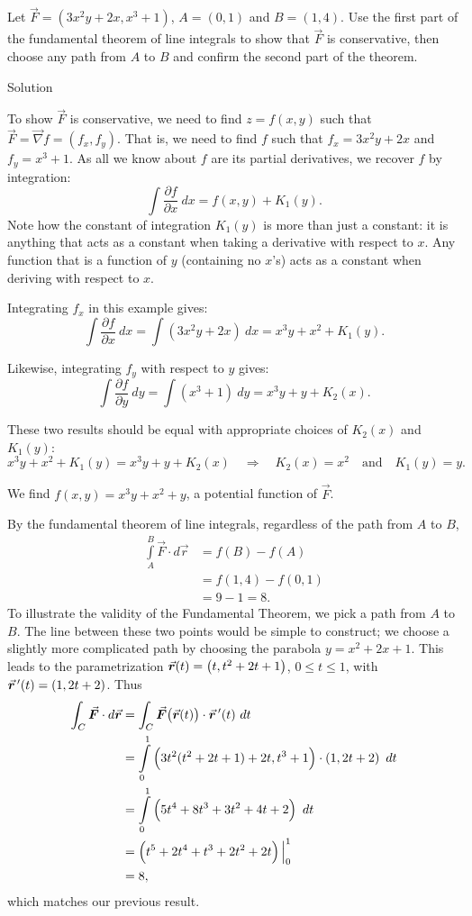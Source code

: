 \begin{example}\label{ex_livf5}
Let $\vec F = \left( 3x^2y+2x, x^3+1\right)$, $A = (0,1)$ and $B = (1,4)$. Use the first part of the fundamental theorem of line integrals to show that $\vec F$ is conservative, then choose any path from $A$ to $B$ and confirm the second part of the theorem.

Solution 


To show $\vec F$ is conservative, we need to find $z = f(x,y)$ such that $\vec F = \vec{\nabla} f = \left( f_x, f_y\right)$. That is, we need to find $f$ such that $f_x = 3x^2y+2x$ and $f_y = x^3+1$. As all we know about $f$ are its partial derivatives, we recover $f$ by integration:
$$\int\limits \frac{\partial f}{\partial x}\ dx = f(x,y) + K_1(y).$$
Note how the constant of integration $K_1(y)$ is more than just a constant: it is anything that acts as a constant when taking a derivative with respect to $x$. Any function that is a function of $y$ (containing no $x$'s) acts as a constant when deriving with respect to $x$.

Integrating $f_x$ in this example gives:
$$\int\limits \frac{\partial f}{\partial x}\ dx = \int\limits (3x^2y+2x)\ dx = x^3y+x^2 + K_1(y).$$

Likewise, integrating $f_y$ with respect to $y$ gives:
$$\int\limits \frac{\partial f}{\partial y}\ dy = \int\limits( x^3+1)\ dy = x^3y+ y + K_2(x).$$

These two results should be equal with appropriate choices of $K_2(x)$ and $K_1(y)$:
$$x^3y+x^2 + K_1(y) = x^3y+ y + K_2(x)\quad \Rightarrow\quad K_2(x) = x^2 \quad \text{and}\quad K_1(y) = y.$$

We find $f(x,y) = x^3y+x^2+y$, a potential function of $\vec F$. 

By the fundamental theorem of line integrals, regardless of the path from $A$ to $B$, 
\begin{align*}
\int\limits_A^B\vec F\cdot d\vec r &= f(B) - f(A) \\[-0.3cm]
			&= f(1,4) - f(0,1) \\
			&= 9 - 1 = 8.
\end{align*}
To illustrate the validity of the Fundamental Theorem, we pick a path from $A$ to $B$. The line between these two points would be simple to construct; we choose a slightly more complicated path by choosing the parabola $y = x^2+2x+1$. This leads to the parametrization $\vrt = \left( t, t^2+2t+1\right)$, $0\leq t\leq 1$, with $\vrp(t) = \left( 1, 2t+2\right)$. Thus
\begin{align*}
\int_C \vec F\cdot d\vec r &= \int_C\vec F\big(\vrt\big)\cdot\vrp(t)\ dt\\
				&= \int\limits_0^1\left( 3t^2(t^2+2t+1)+2t, t^3+1\right)\cdot\left( 1,2t+2\right)\ dt\\
				&= \int\limits_0^1 \left(5t^4+8t^3+3t^2+4t+2\right)\ dt\\
				&= \left(t^5+2t^4+t^3+2t^2+2t\right)\Big|_0^1\\
				&= 8,
\end{align*}				
which matches our previous result.
\end{example}


